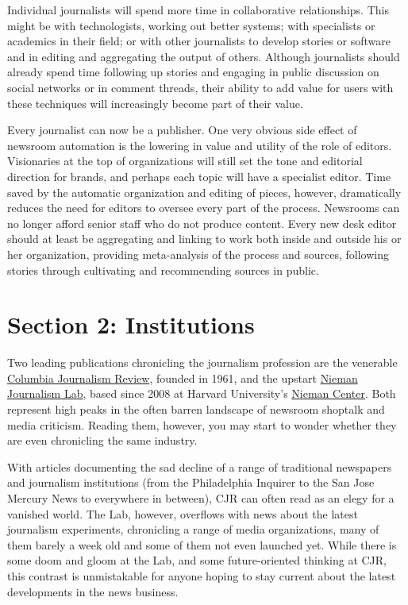 Individual journalists will spend more time in collaborative relationships. This
might be with technologists, working out better systems; with specialists or academics
in their field; or with other journalists to develop stories or software and
in editing and aggregating the output of others.
Although journalists should already spend time following up stories and engaging
in public discussion on social networks or in comment threads, their ability
to add value for users with these techniques will increasingly become part of
their value.

Every journalist can now be a publisher. One very obvious side effect of newsroom
automation is the lowering in value and utility of the role of editors.
Visionaries at the top of organizations will still set the tone and editorial direction
for brands, and perhaps each topic will have a specialist editor. Time saved by
the automatic organization and editing of pieces, however, dramatically reduces
the need for editors to oversee every part of the process. Newsrooms can no
longer afford senior staff who do not produce content. Every new desk editor
should at least be aggregating and linking to work both inside and outside his or
her organization, providing meta-analysis of the process and sources, following
stories through cultivating and recommending sources in public.

\chapter{Section 2: Institutions}
Two leading publications chronicling the journalism profession are the venerable
\href{http://www.cjr.org/}{Columbia Journalism Review}, founded in 1961, and the upstart \href{http://www.niemanlab.org/}{Nieman
Journalism Lab}, based since 2008 at Harvard University’s \href{http://www.nieman.harvard.edu/NiemanFoundation.aspx}{Nieman Center}. Both
represent high peaks in the often barren landscape of newsroom shoptalk and
media criticism. Reading them, however, you may start to wonder whether they
are even chronicling the same industry.

With articles documenting the sad decline of a range of traditional newspapers
and journalism institutions (from the Philadelphia Inquirer to the San Jose Mercury
News to everywhere in between), CJR can often read as an elegy for a vanished
world. The Lab, however, overflows with news about the latest journalism
experiments, chronicling a range of media organizations, many of them barely a
week old and some of them not even launched yet. While there is some doom
and gloom at the Lab, and some future-oriented thinking at CJR, this contrast
is unmistakable for anyone hoping to stay current about the latest developments
in the news business.

